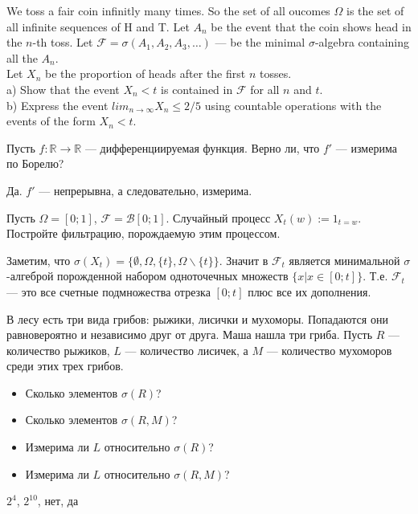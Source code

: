 \begin{solution}
\begin{problem}
We toss a fair coin infinitly many times. So the set of all oucomes $\Omega$ is the set of all infinite sequences of H and T. Let $A_{n}$ be the event that the coin shows head in the $n$-th toss. Let $\mathcal{F}=\sigma(A_{1},A_{2},A_{3},\ldots)$ --- be the minimal $\sigma$-algebra containing all the $A_{n}$. \\
Let $X_{n}$ be the proportion of heads after the first $n$ tosses.\\
a) Show that the event $X_{n}<t$ is contained in $\mathcal{F}$ for all $n$ and $t$. \\
b) Express the event $lim_{n\to\infty}X_{n}\le 2/5$ using countable operations with the events of the form $X_{n}<t$.
\end{problem} 
\begin{solution} 

\end{solution}

\begin{problem}
Пусть $f:\mathbb{R}\to\mathbb{R}$ --- дифференциируемая функция. Верно ли, что $f'$ --- измерима по Борелю?
\end{problem} 
\begin{solution} 
Да. $ f' $ --- непрерывна, а следовательно, измерима.
\end{solution}

\begin{problem}
Пусть $\Omega=[0;1]$, $ \mathcal{F}=\mathcal{B}[0;1] $. Случайный процесс $X_{t}(w):=1_{t=w}$. Постройте фильтрацию, порождаемую этим процессом.
\end{problem} 
\begin{solution} 
Заметим, что $\sigma(X_{t})=\{\emptyset,\Omega,\{t\},\Omega\backslash\{t\}\}$. Значит в $ \mathcal{F}_{t} $ является минимальной $\sigma  $-алгеброй порожденной набором одноточечных множеств $\{x|x\in [0;t]\}$. Т.е. $\mathcal{F}_{t}$ --- это все счетные подмножества отрезка $[0;t]$ плюс все их дополнения.
\end{solution}

\begin{problem}
В лесу есть три вида грибов: рыжики, лисички и мухоморы. Попадаются они равновероятно и независимо друг от друга. Маша нашла три гриба. Пусть $R$ --- количество рыжиков, $ L $ --- количество лисичек, а $ M $ --- количество мухоморов среди этих трех грибов.
\begin{itemize}
\item Сколько элементов $ \sigma(R)$? 
\item Сколько элементов $ \sigma(R,M)$? 
\item Измерима ли $ L $ относительно $ \sigma(R)$?
\item Измерима ли $ L $ относительно $ \sigma(R,M)$?
\end{itemize} 
\end{problem} 
\begin{solution} 
$ 2^{4} $, $2^{10}$, нет, да 
\end{solution}


\end{solution}
